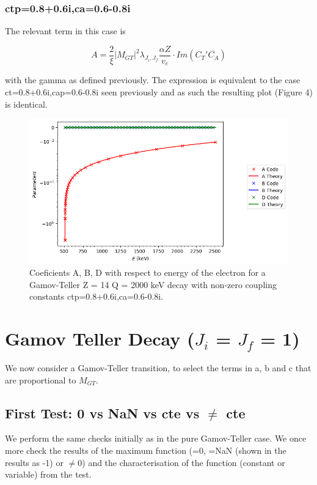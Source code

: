 \documentclass[twocolumn]{article}
\begin{document}
\subsubsection*{ctp=0.8+0.6i,ca=0.6-0.8i}

The relevant term in this case is 

$$A= \frac{2}{\xi}|M_{GT}|^2\lambda_{J_i,J_f}\frac{\alpha Z}{v_e}\cdot Im(C_T'\overline{C_A})$$

with the gamma as defined previously. The expression is equivalent to the case ct=0.8+0.6i,cap=0.6-0.8i seen previously and as such the resulting plot (Figure 4) is identical.


\begin{figure}
	\centering
	\includegraphics[width=\columnwidth]{plots/ctcap_comp_gt_result.png}
	\caption{Coeficients A, B, D with respect to energy of the electron for a Gamov-Teller Z = 14 Q = 2000 keV decay  with non-zero coupling constants ctp=0.8+0.6i,ca=0.6-0.8i.}
\end{figure}

\section{Gamov Teller Decay ($J_i$ = $J_f$ = 1)}

We now consider a Gamov-Teller  transition, to select the terms in a, b and c that are proportional to $M_{GT}$. 


\subsection{First Test:  0 vs NaN vs cte  vs $\neq$ cte}

We perform the same checks initially as in the pure Gamov-Teller case. We once more check the results of the maximum function (=0, =NaN (shown in the results as -1) or $\neq$0) and the characterisation of the function (constant or variable) from the test. 
\end{document}
